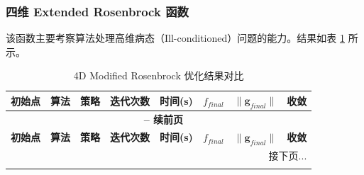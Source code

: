\documentclass[a4paper,12pt]{article}
\begin{document}
\subsubsection{四维 Extended Rosenbrock 函数}
该函数主要考察算法处理高维病态（Ill-conditioned）问题的能力。结果如表 \ref{tab:res_4d} 所示。

{
\small %
\setlength{\tabcolsep}{4pt} %

\begin{longtable}{llccrrrc}
    \caption{4D Modified Rosenbrock 优化结果对比} \label{tab:res_4d} \\

    \toprule
    \textbf{初始点} & \textbf{算法} & \textbf{策略} & \textbf{迭代次数} & \textbf{时间(s)} & \textbf{$f_{final}$} & \textbf{$\|\bm{g}_{final}\|$} & \textbf{收敛} \\
    \midrule
    \endfirsthead

    \multicolumn{8}{c}{{\bfseries \tablename\ \thetable{} -- 续前页}} \\ %
    \toprule
    \textbf{初始点} & \textbf{算法} & \textbf{策略} & \textbf{迭代次数} & \textbf{时间(s)} & \textbf{$f_{final}$} & \textbf{$\|\bm{g}_{final}\|$} & \textbf{收敛} \\
    \midrule
    \endhead

    \midrule
    \multicolumn{8}{r}{{接下页...}} \\
    \endfoot

    \bottomrule
    \endlastfoot


\end{longtable}}
\end{document}
